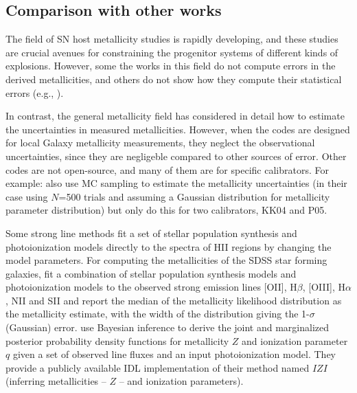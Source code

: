 \documentclass{emulateapj} \usepackage{amsmath} \usepackage{float}
\newcommand{\ha}{\ensuremath{\mathrm{H}\alpha}}
\newcommand{\hb}{\ensuremath{\mathrm{H}\beta}}
\begin{document}

\subsection{Comparison with other works}



The field of SN host metallicity studies is rapidly developing, and
these studies are crucial avenues for constraining the progenitor
systems of different kinds of explosions. However, some the works in
this field do not compute errors in the derived metallicities, and
others do not show how they compute their statistical errors (e.g.,
\citealt{anderson10,leloudas11,sanders12,leloudas14}). %

In contrast, the general metallicity field has considered in detail
how to estimate the uncertainties in measured metallicities. However,
when the codes are designed for local Galaxy metallicity measurements,
they neglect the observational uncertainties, since they are
negligeble compared to other sources of error. Other codes are not
open-source, and many of them are for specific calibrators. For
example: \citet{moustakas10} also use MC sampling to estimate the
metallicity uncertainties (in their case using $N$=500 trials and
assuming a Gaussian distribution for metallicity parameter
distribution) but only do this for two calibrators, KK04 and P05.

Some strong line methods fit a set of stellar population synthesis and
photoionization models directly to the spectra of HII regions by
changing the model parameters. For computing the metallicities of the
SDSS star forming galaxies, \citet{tremonti04} fit a combination of
stellar population synthesis models and photoionization models to the
observed strong emission lines [OII], $\hb$, [OIII], $\ha$, NII and
SII and report the median of the metallicity likelihood distribution
as the metallicity estimate, with the width of the distribution giving
the 1-$\sigma$ (Gaussian) error.  \citet{blanc15} use Bayesian
inference to derive the joint and marginalized posterior probability
density functions for metallicity $Z$ and ionization parameter $q$
given a set of observed line fluxes and an input photoionization
model. They provide a publicly available IDL implementation of their
method named $IZI$ (inferring metallicities -- $Z$ -- and ionization
parameters).
\end{document}
